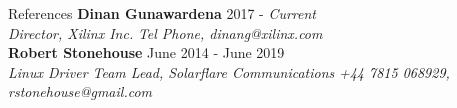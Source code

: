 \documentclass{format/resume} %
\begin{document}
\begin{rSection}{References}
  {\bf Dinan Gunawardena} \hfill {2017 -  \it Current} \\
  {\it Director, Xilinx Inc.} \hfill {\it Tel Phone, dinang@xilinx.com} \\

  {\bf Robert Stonehouse} \hfill {June 2014 -  June 2019} \\
  {\it Linux Driver Team Lead, Solarflare Communications} \hfill {\it +44 7815 068929, rstonehouse@gmail.com} \\

\end{rSection}

\end{document}
